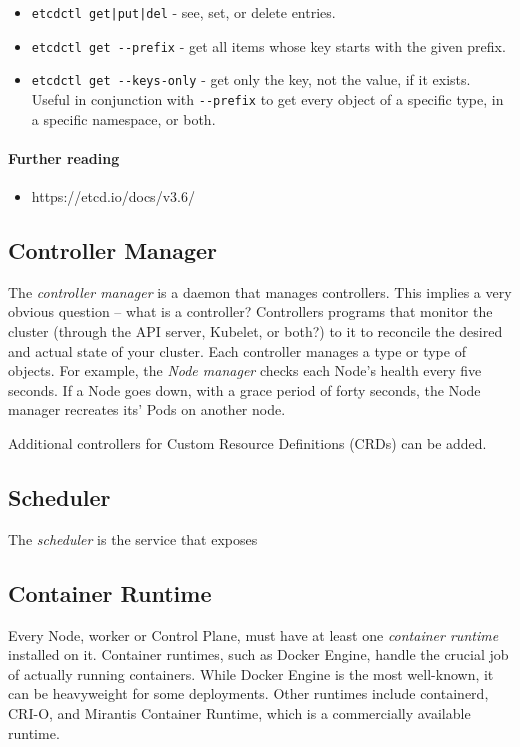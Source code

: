 \documentclass[11pt, a4paper]{article}
\begin{document}
\begin{itemize}
\item \texttt{etcdctl get|put|del} - see, set, or delete entries.
\item \texttt{etcdctl get {-}{-}prefix} - get all items whose key starts with the given prefix.
\item \texttt{etcdctl get {-}{-}keys-only} - get only the key, not the value, if it exists. Useful in conjunction with \texttt{{-}{-}prefix} to get every object of a specific type, in a specific namespace, or both.
\end{itemize}

\paragraph{Further reading}

\begin{itemize}
\item https://etcd.io/docs/v3.6/
\end{itemize}

\subsection{Controller Manager}

The \textit{controller manager} is a daemon that manages controllers. This implies a very obvious question -- what is a controller? Controllers programs that monitor the cluster (through the API server, Kubelet, or both?) to it to reconcile the desired and actual state of your cluster. Each controller manages a type or type of objects. For example, the \textit{Node manager} checks each Node's health every five seconds. If a Node goes down, with a grace period of forty seconds, the Node manager recreates its' Pods on another node. 

Additional controllers for Custom Resource Definitions (CRDs) can be added. 

\subsection{Scheduler}

The \textit{scheduler} is the service that exposes

\subsection{Container Runtime}

Every Node, worker or Control Plane, must have at least one \textit{container runtime} installed on it. Container runtimes, such as Docker Engine, handle the crucial job of actually running containers. While Docker Engine is the most well-known, it can be heavyweight for some deployments. Other runtimes include containerd, CRI-O, and Mirantis Container Runtime, which is a commercially available runtime.
\end{document}
